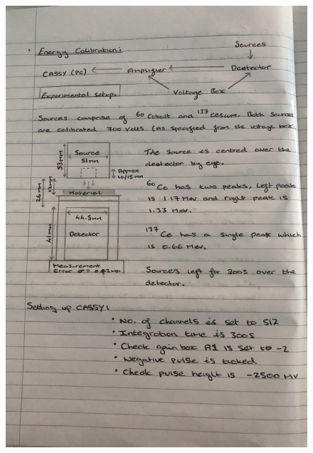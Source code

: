 \documentclass[12pt]{article}
\begin{document}
\begin{figure}[H]
\centering
\includegraphics[scale=0.175]{Images/IMG_0331.JPG}
\end{figure}
\newpage
\end{document}
